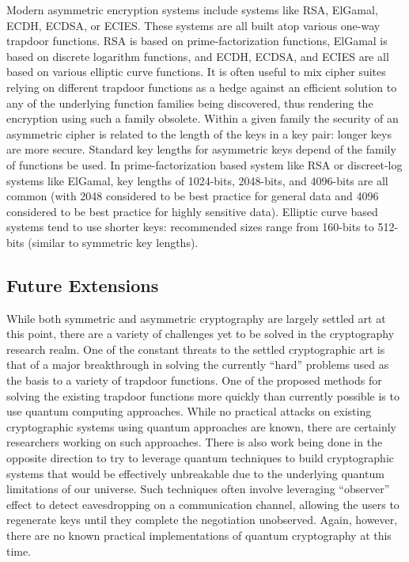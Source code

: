 \documentclass{sig-alternate}
\begin{document}
Modern asymmetric encryption systems include systems like RSA,
ElGamal, ECDH, ECDSA, or ECIES. These systems are all built atop
various one-way trapdoor functions. RSA is based on
prime-factorization functions, ElGamal is based on discrete logarithm
functions, and ECDH, ECDSA, and ECIES are all based on various
elliptic curve functions. It is often useful to mix cipher suites
relying on different trapdoor functions as a hedge against an
efficient solution to any of the underlying function families being
discovered, thus rendering the encryption using such a family
obsolete. Within a given family the security of an asymmetric cipher
is related to the length of the keys in a key pair: longer keys are
more secure. Standard key lengths for asymmetric keys depend of the
family of functions be used. In prime-factorization based system like
RSA or discreet-log systems like ElGamal, key lengths of 1024-bits,
2048-bits, and 4096-bits are all common (with 2048 considered to be
best practice for general data and 4096 considered to be best practice
for highly sensitive data). Elliptic curve based systems tend to use
shorter keys: recommended sizes range from 160-bits to 512-bits
(similar to symmetric key lengths).

\subsection{Future Extensions}

While both symmetric and asymmetric cryptography are largely settled
art at this point, there are a variety of challenges yet to be solved
in the cryptography research realm. One of the constant threats to the
settled cryptographic art is that of a major breakthrough in solving
the currently ``hard'' problems used as the basis to a variety of
trapdoor functions. One of the proposed methods for solving the
existing trapdoor functions more quickly than currently possible is to
use quantum computing approaches. While no practical attacks on
existing cryptographic systems using quantum approaches are known,
there are certainly researchers working on such approaches. There is
also work being done in the opposite direction to try to leverage
quantum techniques to build cryptographic systems that would be
effectively unbreakable due to the underlying quantum limitations of
our universe. Such techniques often involve leveraging ``observer''
effect to detect eavesdropping on a communication channel, allowing
the users to regenerate keys until they complete the negotiation
unobserved. Again, however, there are no known practical
implementations of quantum cryptography at this time.
\end{document}
